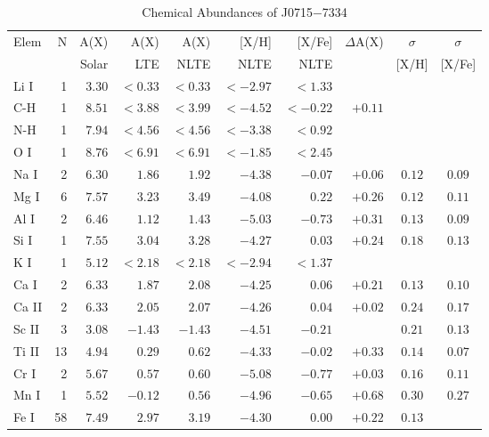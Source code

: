 \documentclass{natureprintstyle}
\newcommand{\umpstar}{J0715$-$7334\xspace}
\begin{document}
\begin{table}
\centering
\setlength{\tabcolsep}{2.5pt}
\caption{Chemical Abundances of \umpstar\label{tab:abunds}}
\begin{tabular}{lrrrrrrrcc}
\hline
Elem & N & A(X)   & A(X)   & A(X)   &  [X/H] & [X/Fe] & $\Delta$A(X) & $\sigma$ & $\sigma$ \\
     &   & Solar  & LTE    & NLTE   &  NLTE  & NLTE   &              & [X/H]    & [X/Fe]   \\
\hline
Li I  &  1 &$ 3.30$&${<}{ 0.33}$&${<}{ 0.33}$&${<}{-2.97}$&${<}{ 1.33}$&       &$    $&$    $\\
C-H   &  1 &$ 8.51$&${<}{ 3.88}$&${<}{ 3.99}$&${<}{-4.52}$&${<}{-0.22}$&$+0.11$&$    $&$    $\\
N-H   &  1 &$ 7.94$&${<}{ 4.56}$&${<}{ 4.56}$&${<}{-3.38}$&${<}{ 0.92}$&       &$    $&$    $\\
O I   &  1 &$ 8.76$&${<}{ 6.91}$&${<}{ 6.91}$&${<}{-1.85}$&${<}{ 2.45}$&       &$    $&$    $\\
Na I  &  2 &$ 6.30$&$   { 1.86}$&$   { 1.92}$&$   {-4.38}$&$   {-0.07}$&$+0.06$&$0.12$&$0.09$\\
Mg I  &  6 &$ 7.57$&$   { 3.23}$&$   { 3.49}$&$   {-4.08}$&$   { 0.22}$&$+0.26$&$0.12$&$0.11$\\
Al I  &  2 &$ 6.46$&$   { 1.12}$&$   { 1.43}$&$   {-5.03}$&$   {-0.73}$&$+0.31$&$0.13$&$0.09$\\
Si I  &  1 &$ 7.55$&$   { 3.04}$&$   { 3.28}$&$   {-4.27}$&$   { 0.03}$&$+0.24$&$0.18$&$0.13$\\
K I   &  1 &$ 5.12$&${<}{ 2.18}$&${<}{ 2.18}$&${<}{-2.94}$&${<}{ 1.37}$&       &$    $&$    $\\
Ca I  &  2 &$ 6.33$&$   { 1.87}$&$   { 2.08}$&$   {-4.25}$&$   { 0.06}$&$+0.21$&$0.13$&$0.10$\\
Ca II &  2 &$ 6.33$&$   { 2.05}$&$   { 2.07}$&$   {-4.26}$&$   { 0.04}$&$+0.02$&$0.24$&$0.17$\\
Sc II &  3 &$ 3.08$&$   {-1.43}$&$   {-1.43}$&$   {-4.51}$&$   {-0.21}$&       &$0.21$&$0.13$\\
Ti II & 13 &$ 4.94$&$   { 0.29}$&$   { 0.62}$&$   {-4.33}$&$   {-0.02}$&$+0.33$&$0.14$&$0.07$\\
Cr I  &  2 &$ 5.67$&$   { 0.57}$&$   { 0.60}$&$   {-5.08}$&$   {-0.77}$&$+0.03$&$0.16$&$0.11$\\
Mn I  &  1 &$ 5.52$&$   {-0.12}$&$   { 0.56}$&$   {-4.96}$&$   {-0.65}$&$+0.68$&$0.30$&$0.27$\\
Fe I  & 58 &$ 7.49$&$   { 2.97}$&$   { 3.19}$&$   {-4.30}$&$   { 0.00}$&$+0.22$&$0.13$&$    $\\

\end{tabular}
\end{table}
\end{document}
